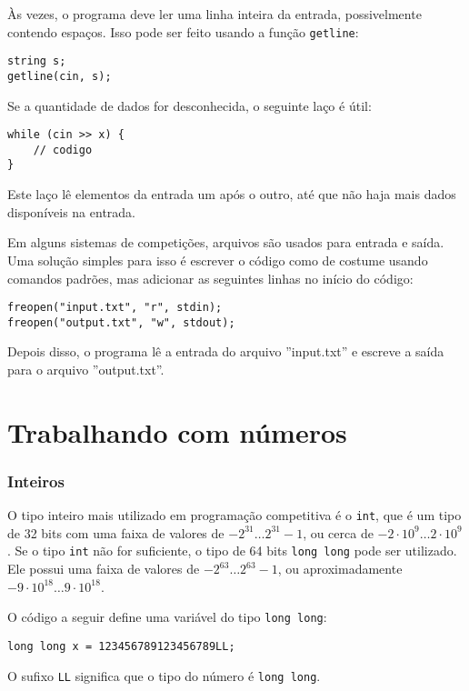 Às vezes, o programa deve ler uma linha inteira da entrada, possivelmente contendo espaços. Isso pode ser feito usando a função \texttt{getline}:

\begin{lstlisting}
string s;
getline(cin, s);
\end{lstlisting}

Se a quantidade de dados for desconhecida, o seguinte laço é útil:
\begin{lstlisting}
while (cin >> x) {
    // codigo
}
\end{lstlisting}
Este laço lê elementos da entrada um após o outro, até que não haja mais dados disponíveis na entrada.

Em alguns sistemas de competições, arquivos são usados para entrada e saída. Uma solução simples para isso é escrever o código como de costume usando comandos padrões, mas adicionar as seguintes linhas no início do código:
\begin{lstlisting}
freopen("input.txt", "r", stdin);
freopen("output.txt", "w", stdout);
\end{lstlisting}
Depois disso, o programa lê a entrada do arquivo ''input.txt'' e escreve a saída para o arquivo ''output.txt''.

\section{Trabalhando com números}


\subsubsection{Inteiros}

O tipo inteiro mais utilizado em programação competitiva é o \texttt{int}, que é um tipo de 32 bits com uma faixa de valores de $-2^{31} \ldots 2^{31}-1$, ou cerca de $-2 \cdot 10^9 \ldots 2 \cdot 10^9$. Se o tipo \texttt{int} não for suficiente, o tipo de 64 bits \texttt{long long} pode ser utilizado. Ele possui uma faixa de valores de $-2^{63} \ldots 2^{63}-1$, ou aproximadamente $-9 \cdot 10^{18} \ldots 9 \cdot 10^{18}$.

O código a seguir define uma variável do tipo \texttt{long long}:
\begin{lstlisting}
long long x = 123456789123456789LL;
\end{lstlisting}
O sufixo \texttt{LL} significa que o tipo do número é \texttt{long long}.

